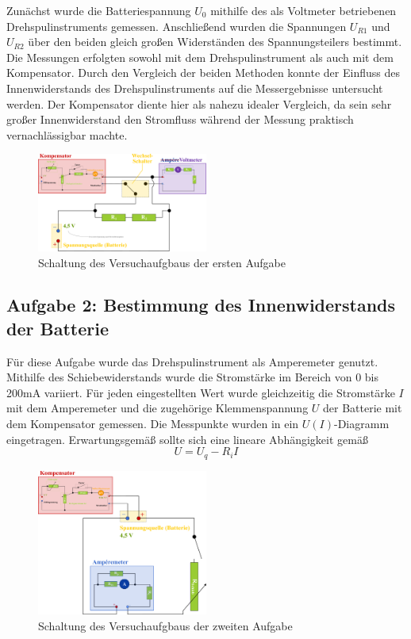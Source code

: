 Zunächst wurde die Batteriespannung $U_0$ mithilfe des als Voltmeter betriebenen Drehspulinstruments gemessen. Anschließend wurden die Spannungen $U_{R1}$ und $U_{R2}$ über den beiden gleich großen Widerständen des Spannungsteilers bestimmt. Die Messungen erfolgten sowohl mit dem Drehspulinstrument als auch mit dem Kompensator. Durch den Vergleich der beiden Methoden konnte der Einfluss des Innenwiderstands des Drehspulinstruments auf die Messergebnisse untersucht werden.
Der Kompensator diente hier als nahezu idealer Vergleich, da sein sehr großer Innenwiderstand den Stromfluss während der Messung praktisch vernachlässigbar machte.

\begin{figure}[!ht]
    \centering
    \includegraphics[width=0.5\textwidth]{img/23/A1SK.pdf}
    \caption{Schaltung des Versuchaufgbaus der ersten Aufgabe}
    \label{fig:a1}
\end{figure}

\subsection*{Aufgabe 2: Bestimmung des Innenwiderstands der Batterie}

Für diese Aufgabe wurde das Drehspulinstrument als Amperemeter genutzt. Mithilfe des Schiebewiderstands wurde die Stromstärke im Bereich von 0 bis 200mA variiert. Für jeden eingestellten Wert wurde gleichzeitig die Stromstärke $I$ mit dem Amperemeter und die zugehörige Klemmenspannung $U$ der Batterie mit dem Kompensator gemessen.
Die Messpunkte wurden in ein $U(I)$-Diagramm eingetragen. Erwartungsgemäß sollte sich eine lineare Abhängigkeit gemäß
\begin{equation}
    U = U_q - R_i I
\end{equation}
\begin{figure}[!ht]
    \centering
    \includegraphics[width=0.5\textwidth]{img/23/A2SK.pdf}
    \caption{Schaltung des Versuchaufgbaus der zweiten Aufgabe}
    \label{fig:a2}
\end{figure}

